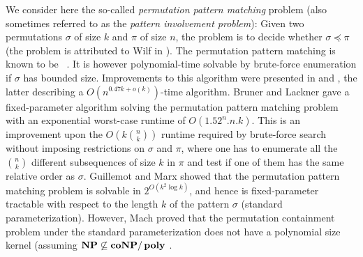 \documentclass[a4paper]{llncs}
\newcounter{num}
\begin{document}
We consider here the so-called \emph{permutation pattern matching} problem
(also sometimes referred to as the \emph{pattern involvement problem}):
Given two permutations $\sigma$ of size $k$ and $\pi$ of size $n$, the problem is to decide whether
$\sigma \preceq \pi$ (the problem is attributed to Wilf in \cite{Bose:Buss:Lubiw:1998}).
The permutation pattern matching is known to be \NPhard~\cite{Bose:Buss:Lubiw:1998}.
It is however polynomial-time solvable by brute-force enumeration
if $\sigma$ has bounded size.
Improvements to this algorithm were presented in
\cite{Albert:Aldred:Atkinson:Holton:ISAAC:2001} and
\cite{Ahal:Rabinovich:2008},
the latter describing a $O(n^{0.47k+o(k)})$-time algorithm.
Bruner and Lackner \cite{DBLP:journals/corr/abs-1204-5224}
gave a fixed-parameter algorithm solving the permutation pattern matching problem with
an exponential worst-case runtime of $O(1.52^{n}.n.k)$.
This is an improvement upon the $O(k {n \choose k})$ runtime required by
brute-force search without imposing restrictions on $\sigma$ and $\pi$,
where one has to enumerate all the ${n \choose k}$ different subsequences of size $k$ in $\pi$
and test if one of them has the same relative
order as $\sigma$.
Guillemot and Marx \cite{Guillemot:Marx:SODA:2014} showed that the permutation pattern matching problem
is solvable in $2^{O(k^2 \log k)}$, and hence is fixed-parameter tractable with respect to the length $k$
of the pattern $\sigma$ (standard parameterization).
However, Mach proved that the permutation containment problem under the
standard parameterization does not have a polynomial size kernel (assuming ${\sf\bf NP} \not\subseteq {\sf\bf coNP} / \operatorname{{\sf\bf poly}}$
\cite{Mach:thesis:1992}.
\end{document}
